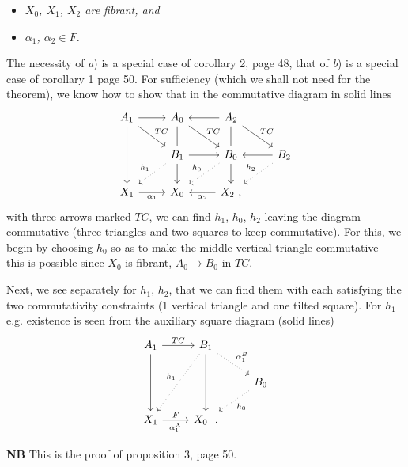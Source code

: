\documentclass[11pt]{article}
\newcommand{\printedpage}[1]{\marginpar{\footnotesize p.~#1}}
\newcommand{\msp}[1]{\marginpar{\footnotesize [#1]}}
\begin{document}
\begin{itemize}[leftmargin=3em]
\item[a)] \textit{$X_0$, $X_1$, $X_2$ are fibrant, and}
\item[b)] \textit{$\alpha_1$, $\alpha_2 \in F$.}
\end{itemize}

The necessity of \textit{a}) is a special case of corollary 2, page 48, that of \textit{b}) is a special case of corollary 1 page 50. For sufficiency (which we shall not need for the theorem), we know how to show that in the commutative diagram in solid lines
\[
\begin{tikzcd}
A_1 \arrow[r] \arrow[dr, "TC"] \arrow[dd] & A_0 \arrow[dr, "TC"] \arrow[d, dash] & A_2 \arrow[l] \arrow[dr, "TC"] \arrow[d, dash] & \\
 & B_1 \arrow[r] \arrow[dl, dotted, "h_1"'] \arrow[d] & B_0 \arrow[dl, dotted, "h_0"'] \arrow[d] & B_2 \arrow[l] \arrow[dl, dotted, "h_2"'] \\
X_1 \arrow[r, "\alpha_1"'] & X_0 & X_2 \ , \arrow[l, "\alpha_2"] &
\end{tikzcd}
\]
with three arrows marked $TC$, we can find $h_1$, $h_0$, $h_2$ leaving the diagram commutative (three triangles and two squares to keep commutative). For this, we begin by choosing $h_0$ so as to make the middle vertical triangle commutative -- this is possible since $X_0$ is fibrant, $A_0 \longrightarrow B_0$ in $TC$.

\printedpage{36}
\msp{page 64}

Next, we see separately for $h_1$, $h_2$, that we can find them with each satisfying the two commutativity constraints (1 vertical triangle and one tilted square). For $h_1$ e.g. existence is seen from the auxiliary square diagram (solid lines)
\[
\begin{tikzcd}
A_1 \arrow[r, "TC"] \arrow[dd] & B_1 \arrow[dd] \arrow[ddl, dotted, "h_1"'] \arrow[dr, dotted, "\alpha_1^B"] & \\
 & & B_0 \arrow[dl, dotted, "h_0"] \\
X_1 \arrow[r, "F", "\alpha_1^X"'] & X_0 \ \ . &
\end{tikzcd}
\]

\textbf{NB} This is the proof of proposition 3, page 50.
\end{document}
